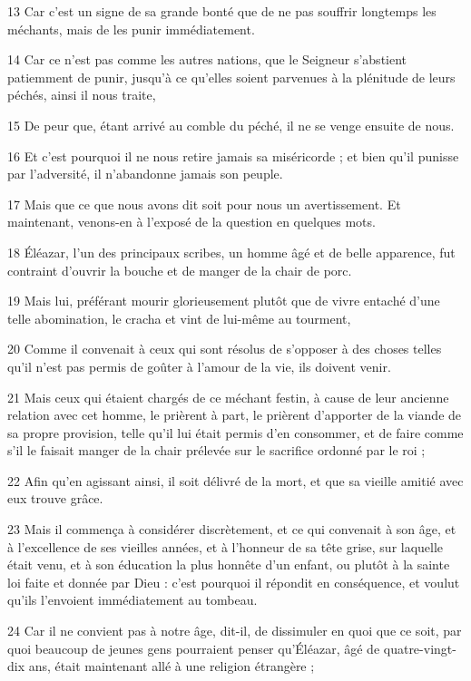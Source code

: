 \par 13 Car c'est un signe de sa grande bonté que de ne pas souffrir longtemps les méchants, mais de les punir immédiatement.
\par 14 Car ce n'est pas comme les autres nations, que le Seigneur s'abstient patiemment de punir, jusqu'à ce qu'elles soient parvenues à la plénitude de leurs péchés, ainsi il nous traite,
\par 15 De peur que, étant arrivé au comble du péché, il ne se venge ensuite de nous.
\par 16 Et c'est pourquoi il ne nous retire jamais sa miséricorde ; et bien qu'il punisse par l'adversité, il n'abandonne jamais son peuple.
\par 17 Mais que ce que nous avons dit soit pour nous un avertissement. Et maintenant, venons-en à l’exposé de la question en quelques mots.
\par 18 Éléazar, l'un des principaux scribes, un homme âgé et de belle apparence, fut contraint d'ouvrir la bouche et de manger de la chair de porc.
\par 19 Mais lui, préférant mourir glorieusement plutôt que de vivre entaché d'une telle abomination, le cracha et vint de lui-même au tourment,
\par 20 Comme il convenait à ceux qui sont résolus de s'opposer à des choses telles qu'il n'est pas permis de goûter à l'amour de la vie, ils doivent venir.
\par 21 Mais ceux qui étaient chargés de ce méchant festin, à cause de leur ancienne relation avec cet homme, le prièrent à part, le prièrent d'apporter de la viande de sa propre provision, telle qu'il lui était permis d'en consommer, et de faire comme s'il le faisait manger de la chair prélevée sur le sacrifice ordonné par le roi ;
\par 22 Afin qu'en agissant ainsi, il soit délivré de la mort, et que sa vieille amitié avec eux trouve grâce.
\par 23 Mais il commença à considérer discrètement, et ce qui convenait à son âge, et à l'excellence de ses vieilles années, et à l'honneur de sa tête grise, sur laquelle était venu, et à son éducation la plus honnête d'un enfant, ou plutôt à la sainte loi faite et donnée par Dieu : c'est pourquoi il répondit en conséquence, et voulut qu'ils l'envoient immédiatement au tombeau.
\par 24 Car il ne convient pas à notre âge, dit-il, de dissimuler en quoi que ce soit, par quoi beaucoup de jeunes gens pourraient penser qu'Éléazar, âgé de quatre-vingt-dix ans, était maintenant allé à une religion étrangère ;

